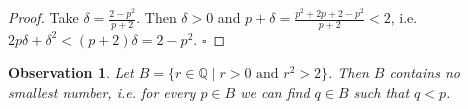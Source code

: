 \documentclass[10pt,varwidth=6in,margin=0.2in,preview]{standalone}
\newtheorem*{_observation}{Observation}
\begin{document}
\begin{flushleft}
\begin{proof}
Take $\delta = \frac{2 - p^2}{p + 2}$.
Then $\delta > 0$ and $p + \delta = \frac{p^2 + 2p + 2 - p^2}{p + 2} < 2$,
i.e. $2 p \delta + \delta^2 < (p + 2) \delta = 2 - p^2$. $\square$
\end{proof}


\begin{_observation}
Let $B = \{ r \in \mathbb{Q} \mid r > 0 \text{ and } r^2 > 2 \}$. 
Then $B$ contains no smallest number, i.e. for every $p \in B$ we can find $q \in B$ such that $q < p$.
\end{_observation}


\end{flushleft}
\end{document}
